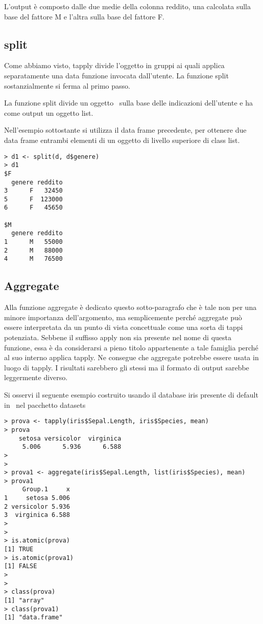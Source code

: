 L'output è composto dalle due medie della colonna reddito, una calcolata sulla base del fattore M e l'altra sulla base del fattore F.

\subsection{split}

Come abbiamo visto, \textsf{tapply} divide l'oggetto in gruppi ai quali applica separatamente una data funzione invocata dall'utente. La funzione \textsf{split} sostanzialmente si ferma al primo passo.

La funzione \textsf{split} divide un oggetto \erre\ sulla base delle indicazioni dell'utente e ha come output un oggetto list.

Nell'esempio sottostante si utilizza il data frame precedente, per ottenere due data frame entrambi elementi di un oggetto di livello superiore di class list.

\begin{lstlisting}	
> d1 <- split(d, d$genere)
> d1
$F
  genere reddito
3      F   32450
5      F  123000
6      F   45650

$M
  genere reddito
1      M   55000
2      M   88000
4      M   76500
\end{lstlisting}

\subsection{Aggregate}

Alla funzione aggregate è dedicato questo sotto-paragrafo che è tale non per una minore importanza dell'argomento, ma semplicemente perché aggregate può essere interpretata da un punto di vista concettuale come una sorta di tappi potenziata. Sebbene il suffisso apply non sia presente nel nome di questa funzione, essa è da considerarsi a pieno titolo appartenente a tale famiglia perché al suo interno applica tapply. Ne consegue che aggregate potrebbe essere usata in luogo di tapply. I risultati sarebbero gli stessi ma il formato di output sarebbe leggermente diverso.

Si osservi il seguente esempio costruito usando il database iris presente di default in \erre\ nel pacchetto datasets
\begin{lstlisting}	
> prova <- tapply(iris$Sepal.Length, iris$Species, mean)
> prova
    setosa versicolor  virginica 
     5.006      5.936      6.588 
>
>
> prova1 <- aggregate(iris$Sepal.Length, list(iris$Species), mean)
> prova1
     Group.1     x
1     setosa 5.006
2 versicolor 5.936
3  virginica 6.588
>
>
> is.atomic(prova)
[1] TRUE
> is.atomic(prova1)
[1] FALSE
>
>
> class(prova)
[1] "array"
> class(prova1)
[1] "data.frame"
\end{lstlisting}

